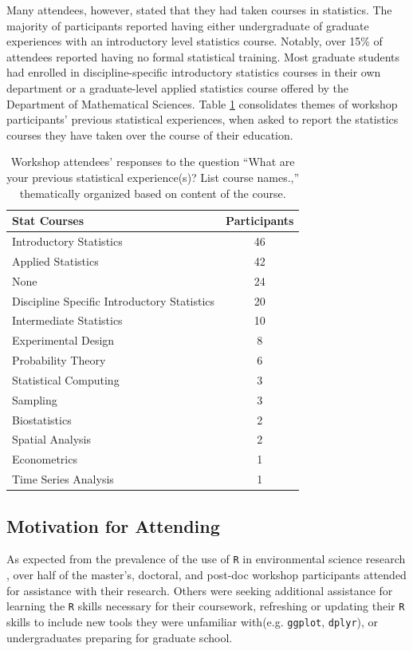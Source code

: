 \documentclass[12pt]{article}
\begin{document}
\quad Many attendees, however, stated that they had taken courses in statistics.
The majority of participants reported having either undergraduate of graduate
experiences with an introductory level statistics course. Notably, over 15\% of
attendees reported having no formal statistical training. Most graduate students
had enrolled in discipline-specific introductory statistics courses in their own
department or a graduate-level applied statistics course offered by the
Department of Mathematical Sciences. Table \ref{tab:statistics} consolidates 
themes of workshop participants' previous statistical experiences, when asked to
report the statistics courses they have taken over the course of their
education. 

{
\begin{table}[h!]
    \centering
    \begin{tabular}{lc}
\hline
Stat Courses & Participants \\
\hline
Introductory Statistics & 46 \\
Applied Statistics & 42 \\
None & 24 \\
Discipline Specific Introductory Statistics & 20 \\
Intermediate Statistics & 10 \\
Experimental Design	& 8 \\
Probability Theory	& 6 \\
Statistical Computing & 3 \\
Sampling & 3 \\
Biostatistics & 2 \\
Spatial Analysis & 2 \\
Econometrics & 1 \\
Time Series Analysis & 1 \\
\hline
\end{tabular}
\caption{Workshop attendees' responses to the question ``What are your previous
statistical experience(s)?  List course names.,'' thematically organized based
on content of the course.}
\label{tab:statistics}
\end{table}
}

\subsection{Motivation for Attending} 

\quad As expected from the prevalence of the use of \texttt{R} in environmental
science research \citep{Rpopular, mislan}, over half of the master's, doctoral, 
and post-doc workshop participants attended for assistance with their research. 
Others were seeking additional assistance for learning the \texttt{R} skills
necessary for their coursework, refreshing or updating their \texttt{R}
skills to include new tools they were unfamiliar with(e.g. \texttt{ggplot}, 
\texttt{dplyr}), or undergraduates preparing for graduate school.  
\end{document}
